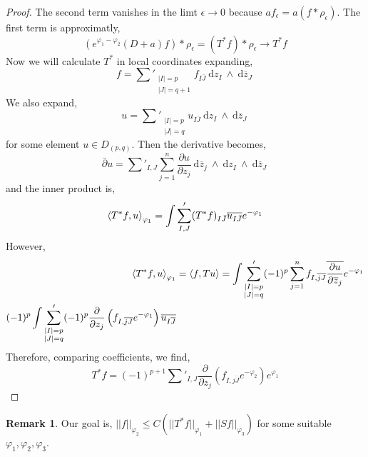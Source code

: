 \documentclass[12pt]{extarticle}
\renewcommand{\d}[1]{\: \mathrm{d}#1 \:}
\newcommand{\pderiv}[2]{\frac{\partial{#1}}{\partial{#2}}}
\theoremstyle{definition}
\newtheorem{remark}{Remark}
\begin{document}
\begin{proof}
The second term vanishes in the limt $\epsilon \to 0$ because $a f_\epsilon = a (f * \rho_\epsilon)$. 
The first term is approximatly,
\[ (e^{\varphi_1 -\varphi_2} (D + a) f) * \rho_\epsilon = (T^* f) * \rho_\epsilon \to T^* f \]
Now we will calculate $T^*$ in local coordinates expanding,
\[ f = \sum'_{\substack{|I| = p \\ |J| = q + 1}} f_{I\bar{J}} \d{z_I} \wedge \d{\overline{z}_J} \]
We also expand,
\[ u = \sum'_{\substack{|I| = p \\ |J| = q}} u_{I\bar{J}} \d{z_I} \wedge \d{\overline{z}_J} \]
for some element $u \in D_{(p,q)}$. Then the derivative becomes,
\[ \bar{\partial} u = \sum'_{I,J} \sum_{j = 1}^n \pderiv{u}{z_j} \d{\overline{z}_j} \wedge \d{z_I} \wedge \d{\overline{z}_J} \]
and the inner product is,
\[ \left< T^* f, u \right>_{\varphi_1} = \int \sum_{I,J}' (T^* f)_{I \bar{J}} \overline{u_{I \bar{J}}} e^{-\varphi_1} \]
However,
\begin{align*}
\inner{T^* f}{u}_{\varphi_1} & = \inner{f}{Tu} = \int \sum'_{\substack{|I| = p \\ |J| = q}} (-1)^p \sum_{j = 1}^n f_{I, \overline{jJ}} \overline{\pderiv{u}{\overline{z}_j}} e^{-\varphi_1}
\\
(-1)^p \int \sum'_{\substack{|I| = p \\ |J| = q}} (-1)^p \pderiv{}{z_j} \left( f_{I, \overline{jJ}} e^{-\varphi_1} \right) \overline{u_{I \overline{J}}} 
\end{align*}
Therefore, comparing coefficients, we find,
\[ T^* f = (-1)^{p+1} \sum'_{I,J} \pderiv{}{z_j} \left( f_{I, \overline{j J}} e^{-\varphi_2} \right) e^{\varphi_1} \]
\end{proof}

\begin{remark}
Our goal is, $|| f ||_{\varphi_2} \le C \left( || T^* f ||_{\varphi_1} + || S f ||_{\varphi_3} \right)$ for some suitable $\varphi_1, \varphi_2, \varphi_3$.
\end{remark}
\end{document}
